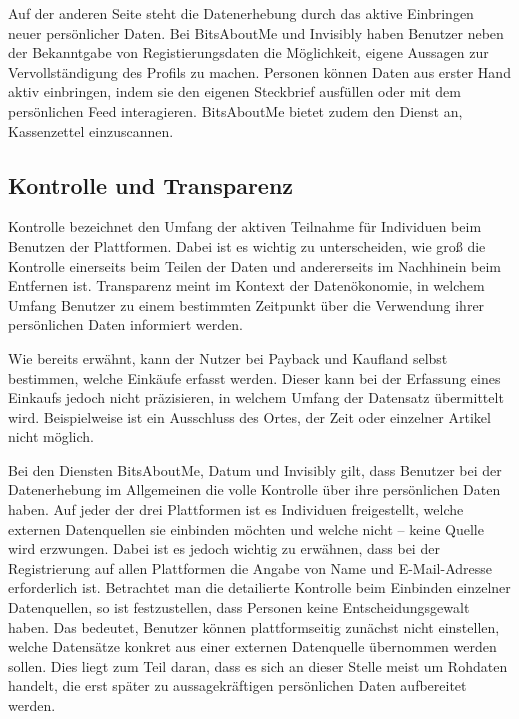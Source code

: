 \noindent Auf der anderen Seite steht die Datenerhebung durch das aktive Einbringen neuer persönlicher Daten. Bei BitsAboutMe und Invisibly haben Benutzer neben der Bekanntgabe von Registierungsdaten die Möglichkeit, eigene Aussagen zur Vervollständigung des Profils zu machen. Personen können Daten aus erster Hand aktiv einbringen, indem sie den eigenen Steckbrief ausfüllen oder mit dem persönlichen Feed interagieren. BitsAboutMe bietet zudem den Dienst an, Kassenzettel einzuscannen. 

\subsection{Kontrolle und Transparenz}
Kontrolle bezeichnet den Umfang der aktiven Teilnahme für Individuen beim Benutzen der Plattformen. Dabei ist es wichtig zu unterscheiden, wie groß die Kontrolle einerseits beim Teilen der Daten und andererseits im Nachhinein beim Entfernen ist. Transparenz meint im Kontext der Datenökonomie, in welchem Umfang Benutzer zu einem bestimmten Zeitpunkt über die Verwendung ihrer persönlichen Daten informiert werden. \newline

\noindent Wie bereits erwähnt, kann der Nutzer bei Payback und Kaufland selbst bestimmen, welche Einkäufe erfasst werden. Dieser kann bei der Erfassung eines Einkaufs jedoch nicht präzisieren, in welchem Umfang der Datensatz übermittelt wird. Beispielweise ist ein Ausschluss des Ortes, der Zeit oder einzelner Artikel nicht möglich. \newline

\noindent Bei den Diensten BitsAboutMe, Datum und Invisibly gilt, dass Benutzer bei der Datenerhebung im Allgemeinen die volle Kontrolle über ihre persönlichen Daten haben. Auf jeder der drei Plattformen ist es Individuen freigestellt, welche externen Datenquellen sie einbinden möchten und welche nicht -- keine Quelle wird erzwungen. Dabei ist es jedoch wichtig zu erwähnen, dass bei der Registrierung auf allen Plattformen die Angabe von Name und E-Mail-Adresse erforderlich ist. Betrachtet man die detailierte Kontrolle beim Einbinden einzelner Datenquellen, so ist festzustellen, dass Personen keine Entscheidungsgewalt haben. Das bedeutet, Benutzer können plattformseitig zunächst nicht einstellen, welche Datensätze konkret aus einer externen Datenquelle übernommen werden sollen. Dies liegt zum Teil daran, dass es sich an dieser Stelle meist um Rohdaten handelt, die erst später zu aussagekräftigen persönlichen Daten aufbereitet werden. \newline

